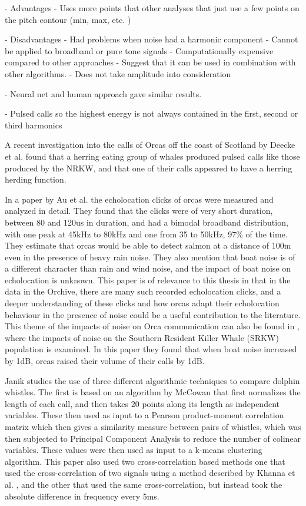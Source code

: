    - Advantages
     - Uses more points that other analyses that just use a few points
       on the pitch contour (min, max, etc. \cite{au00})

   - Disadvantages
   	 - Had problems when noise had a harmonic component
   	 - Cannot be applied to broadband or pure tone signals
     - Computationally expensive compared to other approaches
     - Suggest that it can be used in combination with other algorithms.
	 - Does not take amplitude into consideration
	
   - Neural net and human approach gave similar results.

- Pulsed calls so the highest energy is not always contained in the
first, second or third harmonics \cite{watkins67}

A recent investigation into the calls of Orcas off the coast of
Scotland by Deecke et al. \cite{deecke11} found that a herring eating
group of whales produced pulsed calls like those produced by the NRKW,
and that one of their calls appeared to have a herring herding
function.

In a paper by Au et al. \cite{au04} the echolocation clicks of orcas
were measured and analyzed in detail.  They found that the clicks were
of very short duration, between 80 and 120us in duration, and had a
bimodal broadband distribution, with one peak at 45kHz to 80kHz and
one from 35 to 50kHz, 97\% of the time.  They estimate that orcas
would be able to detect salmon at a distance of 100m even in the
presence of heavy rain noise.  They also mention that boat noise is of
a different character than rain and wind noise, and the impact of boat
noise on echolocation is unknown.  This paper is of relevance to this
thesis in that in the data in the Orchive, there are many such
recorded echolocation clicks, and a deeper understanding of these
clicks and how orcas adapt their echolocation behaviour in the
presence of noise could be a useful contribution to the literature.
This theme of the impacts of noise on Orca communication can also be
found in \cite{holt09}, where the impacts of noise on the Southern
Resident Killer Whale (SRKW) population is examined.  In this paper
they found that when boat noise increased by 1dB, orcas raised their
volume of their calls by 1dB.

Janik \cite{janik99} studies the use of three different algorithmic
techniques to compare dolphin whistles.  The first is based on an
algorithm by McCowan \cite{mccowan95} that first normalizes the length
of each call, and then takes 20 points along its length as independent
variables.  These then used as input to a Pearson product-moment
correlation matrix which then gives a similarity measure between pairs
of whistles, which was then subjected to Principal Component Analysis
to reduce the number of colinear variables.  These values were then
used as input to a k-means clustering algorithm.  This paper also used
two cross-correlation based methods one that used the
cross-correlation of two signals using a method described by Khanna et
al. \cite{khanna97}, and the other that used the same
cross-correlation, but instead took the absolute difference in
frequency every 5ms.

